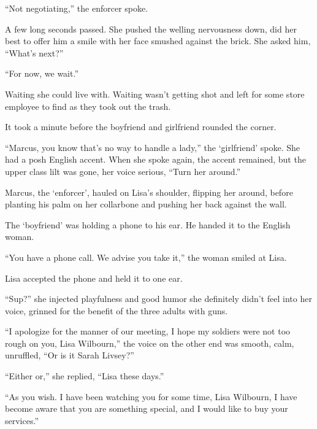 ``Not negotiating,'' the enforcer spoke.



A few long seconds passed.  She pushed the welling nervousness down, did her best to offer him a smile with her face smushed against the brick.  She asked him, ``What's next?''



``For now, we wait.''



Waiting she could live with.  Waiting wasn't getting shot and left for some store employee to find as they took out the trash.



It took a minute before the boyfriend and girlfriend rounded the corner.



``Marcus, you know that's no way to handle a lady,'' the `girlfriend' spoke.  She had a posh English accent.  When she spoke again, the accent remained, but the upper class lilt was gone, her voice serious, ``Turn her around.''



Marcus, the `enforcer', hauled on Lisa's shoulder, flipping her around, before planting his palm on her collarbone and pushing her back against the wall.



The `boyfriend' was holding a phone to his ear.  He handed it to the English woman.



``You have a phone call.  We advise you take it,'' the woman smiled at Lisa.



Lisa accepted the phone and held it to one ear.



``Sup?'' she injected playfulness and good humor she definitely didn't feel into her voice, grinned for the benefit of the three adults with guns.



``I apologize for the manner of our meeting, I hope my soldiers were not too rough on you, Lisa Wilbourn,'' the voice on the other end was smooth, calm, unruffled, ``Or is it Sarah Livsey?''



``Either or,'' she replied,  ``Lisa these days.''



``As you wish.  I have been watching you for some time, Lisa Wilbourn, I have become aware that you are something special, and I would like to buy your services.''



